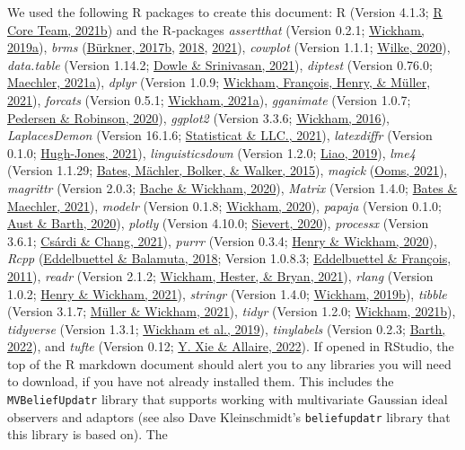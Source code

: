 \documentclass[
  11pt,
  man,floatsintext]{apa6}
\begin{document}
We used the following R packages to create this document: R (Version 4.1.3; \protect\hyperlink{ref-R-base}{R Core Team, 2021b}) and the R-packages \emph{assertthat} (Version 0.2.1; \protect\hyperlink{ref-R-assertthat}{Wickham, 2019a}), \emph{brms} (\protect\hyperlink{ref-R-brms_a}{Bürkner, 2017b}, \protect\hyperlink{ref-R-brms_b}{2018}, \protect\hyperlink{ref-R-brms_c}{2021}), \emph{cowplot} (Version 1.1.1; \protect\hyperlink{ref-R-cowplot}{Wilke, 2020}), \emph{data.table} (Version 1.14.2; \protect\hyperlink{ref-R-data.table}{Dowle \& Srinivasan, 2021}), \emph{diptest} (Version 0.76.0; \protect\hyperlink{ref-R-diptest}{Maechler, 2021a}), \emph{dplyr} (Version 1.0.9; \protect\hyperlink{ref-R-dplyr}{Wickham, François, Henry, \& Müller, 2021}), \emph{forcats} (Version 0.5.1; \protect\hyperlink{ref-R-forcats}{Wickham, 2021a}), \emph{gganimate} (Version 1.0.7; \protect\hyperlink{ref-R-gganimate}{Pedersen \& Robinson, 2020}), \emph{ggplot2} (Version 3.3.6; \protect\hyperlink{ref-R-ggplot2}{Wickham, 2016}), \emph{LaplacesDemon} (Version 16.1.6; \protect\hyperlink{ref-R-LaplacesDemon}{Statisticat \& LLC., 2021}), \emph{latexdiffr} (Version 0.1.0; \protect\hyperlink{ref-R-latexdiffr}{Hugh-Jones, 2021}), \emph{linguisticsdown} (Version 1.2.0; \protect\hyperlink{ref-R-linguisticsdown}{Liao, 2019}), \emph{lme4} (Version 1.1.29; \protect\hyperlink{ref-R-lme4}{Bates, Mächler, Bolker, \& Walker, 2015}), \emph{magick} (\protect\hyperlink{ref-R-magick}{Ooms, 2021}), \emph{magrittr} (Version 2.0.3; \protect\hyperlink{ref-R-magrittr}{Bache \& Wickham, 2020}), \emph{Matrix} (Version 1.4.0; \protect\hyperlink{ref-R-Matrix}{Bates \& Maechler, 2021}), \emph{modelr} (Version 0.1.8; \protect\hyperlink{ref-R-modelr}{Wickham, 2020}), \emph{papaja} (Version 0.1.0; \protect\hyperlink{ref-R-papaja}{Aust \& Barth, 2020}), \emph{plotly} (Version 4.10.0; \protect\hyperlink{ref-R-plotly}{Sievert, 2020}), \emph{processx} (Version 3.6.1; \protect\hyperlink{ref-R-processx}{Csárdi \& Chang, 2021}), \emph{purrr} (Version 0.3.4; \protect\hyperlink{ref-R-purrr}{Henry \& Wickham, 2020}), \emph{Rcpp} (\protect\hyperlink{ref-R-Rcpp_b}{Eddelbuettel \& Balamuta, 2018}; Version 1.0.8.3; \protect\hyperlink{ref-R-Rcpp_a}{Eddelbuettel \& François, 2011}), \emph{readr} (Version 2.1.2; \protect\hyperlink{ref-R-readr}{Wickham, Hester, \& Bryan, 2021}), \emph{rlang} (Version 1.0.2; \protect\hyperlink{ref-R-rlang}{Henry \& Wickham, 2021}), \emph{stringr} (Version 1.4.0; \protect\hyperlink{ref-R-stringr}{Wickham, 2019b}), \emph{tibble} (Version 3.1.7; \protect\hyperlink{ref-R-tibble}{Müller \& Wickham, 2021}), \emph{tidyr} (Version 1.2.0; \protect\hyperlink{ref-R-tidyr}{Wickham, 2021b}), \emph{tidyverse} (Version 1.3.1; \protect\hyperlink{ref-R-tidyverse}{Wickham et al., 2019}), \emph{tinylabels} (Version 0.2.3; \protect\hyperlink{ref-R-tinylabels}{Barth, 2022}), and \emph{tufte} (Version 0.12; \protect\hyperlink{ref-R-tufte}{Y. Xie \& Allaire, 2022}). If opened in RStudio, the top of the R markdown document should alert you to any libraries you will need to download, if you have not already installed them. This includes the \texttt{MVBeliefUpdatr} library that supports working with multivariate Gaussian ideal observers and adaptors (see also Dave Kleinschmidt's \texttt{beliefupdatr} library that this library is based on). The 
\end{document}

